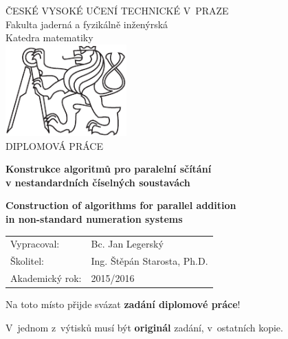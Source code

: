 \documentclass[a4paper, 11pt, twoside, openright]{report}
\theoremstyle{definition}
\newcommand{\cvut}{ČESKÉ VYSOKÉ UČENÍ TECHNICKÉ V~PRAZE}
\newcommand{\fjfi}{Fakulta jaderná a fyzikálně inženýrská}
\newcommand{\km}{Katedra matematiky}
\newcommand{\nazevczBreaked}{Konstrukce algoritm\r u pro paraleln\'i s\v c\'it\'an\'i \\[8pt] v nestandardn\'ich \v c\'iseln\'ych soustav\'ach}
\newcommand{\nazevenBreaked}{Construction of algorithms for parallel addition  \\[8pt] in non-standard numeration systems}
\newcommand{\autor}{Jan Legersk\'y}
\newcommand{\autorBc}{Bc. Jan Legersk\'y}
\newcommand{\vedouci}{Ing. \v St\v ep\'an Starosta, Ph.D.}
\begin{document}
\begin{titlepage}
%


\thispagestyle{empty}
\begin{center}
	{\Large \cvut \\[10pt] \fjfi \\[10pt] \km\\}
	\vspace{45pt} %
	\includegraphics[height=100pt]{img/logoCVUT.pdf}\\
	\vspace{70pt}
	{\Large DIPLOMOV\'A PR\'ACE}
	\vspace{70pt}
	
	{\Large\bf \nazevczBreaked}
	\vspace{30pt}
	
	{\Large\bf \nazevenBreaked}
\end{center}
\vfill
{
	\Large
	\begin{tabular}{ll}
	Vypracoval: & \autorBc\\[3pt]
	\v Skolitel: & \vedouci\\[3pt]
	Akademick\'y rok: & 2015/2016
	\end{tabular}
}
\cleardoublepage
\thispagestyle{empty}

 \thispagestyle{empty}
 \Large
 Na toto místo přijde svázat \textbf{zadání diplomové práce}!
 
 \vspace{4mm}
 V~jednom z~výtisků musí být \textbf{originál} zadání, v~ostatních kopie.
 \normalsize
\cleardoublepage


\end{titlepage}
\end{document}
